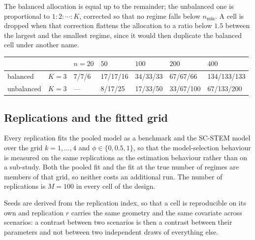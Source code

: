 The balanced allocation is equal up to the remainder; the unbalanced one is proportional to $1:2:\cdots:K$, corrected so that no regime falls below $n_{\min}$. A cell is dropped when that correction flattens the allocation to a ratio below $1.5$ between the largest and the smallest regime, since it would then duplicate the balanced cell under another name.

\begin{center}
\begin{tabular}{lllllll}
\toprule
& & $n = 20$ & $50$ & $100$ & $200$ & $400$ \\
\midrule
balanced   & $K=3$ & 7/7/6 & 17/17/16 & 34/33/33 & 67/67/66 & 134/133/133 \\
unbalanced & $K=3$ & --- & 8/17/25 & 17/33/50 & 33/67/100 & 67/133/200 \\
\bottomrule
\end{tabular}
\end{center}

\subsection{Replications and the fitted grid}

Every replication fits the pooled model as a benchmark and the SC-STEM model over the grid $k = 1,\dots,4$ and $\phi \in \{0, 0.5, 1\}$, so that the model-selection behaviour is measured on the same replications as the estimation behaviour rather than on a sub-study. Both the pooled fit and the fit at the true number of regimes are members of that grid, so neither costs an additional run. The number of replications is $M = 100$ in every cell of the design.

Seeds are derived from the replication index, so that a cell is reproducible on its own and replication $r$ carries the same geometry and the same covariate across scenarios: a contrast between two scenarios is then a contrast between their parameters and not between two independent draws of everything else.

